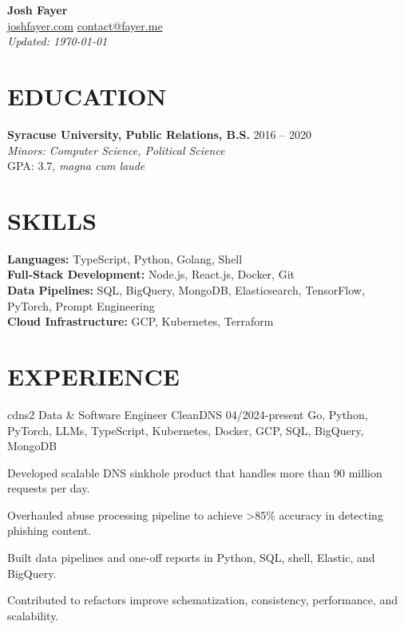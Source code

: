 \documentclass[letterpaper,10pt]{article}
\begin{document}
\begin{center}
    {\huge\textbf{Josh Fayer}} \\
        \href{https://joshfayer.com}{joshfayer.com} \quad
        \href{mailto:contact@fayer.me}{contact@fayer.me} \quad \\
        \emph{Updated: \monthyear\today}
\end{center}

\vspace{0.1cm}

\section*{EDUCATION}
\noindent\textbf{Syracuse University, Public Relations, B.S.} \hfill 2016 -- 2020 \\
\emph{Minors: Computer Science, Political Science} \\
GPA: 3.7, \emph{magna cum laude}

\section*{SKILLS}
\noindent\textbf{Languages:} TypeScript, Python, Golang, Shell \\
\noindent\textbf{Full-Stack Development:} Node.js, React.js, Docker, Git \\
\noindent\textbf{Data Pipelines:} SQL, BigQuery, MongoDB, Elasticsearch, TensorFlow, PyTorch, Prompt Engineering \\
\textbf{Cloud Infrastructure:} GCP, Kubernetes, Terraform

\section*{EXPERIENCE}

\jobentry
    {cdns2}
    {Data \& Software Engineer}
    {CleanDNS}
    {04/2024-present}
    {Go, Python, PyTorch, LLMs, TypeScript, Kubernetes, Docker, GCP, SQL, BigQuery, MongoDB}
    {
        \item Developed scalable DNS sinkhole product that handles more than 90 million requests per day.
        \item Overhauled abuse processing pipeline to achieve >85\% accuracy in detecting phishing content.
        \item Built data pipelines and one-off reports in Python, SQL, shell, Elastic, and BigQuery.
        \item Contributed to refactors improve schematization, consistency, performance, and scalability.
    }
\end{document}
